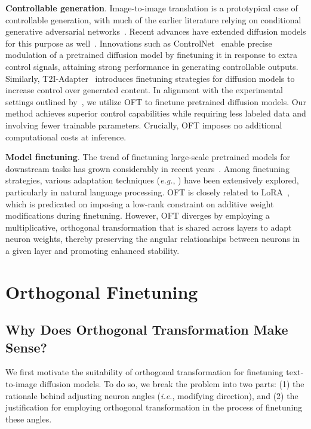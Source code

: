 \textbf{Controllable generation}. Image-to-image translation is a prototypical case of controllable generation, with much of the earlier literature relying on conditional generative adversarial networks~\cite{isola2017image,zhu2017toward,wang2018high,park2019semantic,choi2018stargan}. Recent advances have extended diffusion models for this purpose as well~\cite{saharia2022palette,voynov2022sketch,wang2022pretraining}. Innovations such as ControlNet~\cite{zhang2023adding} enable precise modulation of a pretrained diffusion model by finetuning it in response to extra control signals, attaining strong performance in generating controllable outputs. Similarly, T2I-Adapter~\cite{mou2023t2i} introduces finetuning strategies for diffusion models to increase control over generated content. In alignment with the experimental settings outlined by~\cite{zhang2023adding,mou2023t2i}, we utilize OFT to finetune pretrained diffusion models. Our method achieves superior control capabilities while requiring less labeled data and involving fewer trainable parameters. Crucially, OFT imposes no additional computational costs at inference.

\textbf{Model finetuning}. The trend of finetuning large-scale pretrained models for downstream tasks has grown considerably in recent years~\cite{devlin2018bert,brown2020language,he2022masked}. Among finetuning strategies, various adaptation techniques (\emph{e.g.}, \cite{hulora2022,houlsby2019parameter,pfeiffer2020adapterfusion}) have been extensively explored, particularly in natural language processing. OFT is closely related to LoRA~\cite{hulora2022}, which is predicated on imposing a low-rank constraint on additive weight modifications during finetuning. However, OFT diverges by employing a multiplicative, orthogonal transformation that is shared across layers to adapt neuron weights, thereby preserving the angular relationships between neurons in a given layer and promoting enhanced stability.

\section{Orthogonal Finetuning}

\subsection{Why Does Orthogonal Transformation Make Sense?}

We first motivate the suitability of orthogonal transformation for finetuning text-to-image diffusion models. To do so, we break the problem into two parts: (1) the rationale behind adjusting neuron angles (\emph{i.e.}, modifying direction), and (2) the justification for employing orthogonal transformation in the process of finetuning these angles.

